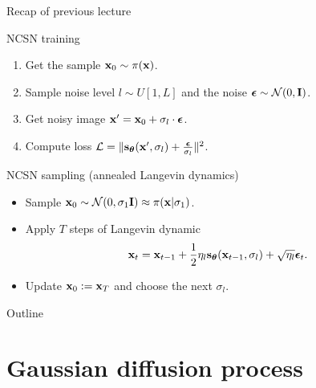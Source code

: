 \begin{frame}{Recap of previous lecture}
	\begin{block}{NCSN training}
		\begin{enumerate}
			\item Get the sample $\mathbf{x}_0 \sim \pi(\mathbf{x})$.
			\item Sample noise level $l \sim U[1, L]$ and the noise $\boldsymbol{\epsilon} \sim \mathcal{N}(0, \mathbf{I})$.
			\item Get noisy image $\mathbf{x}' = \mathbf{x}_0 + \sigma_l \cdot \boldsymbol{\epsilon}$.
			\item Compute loss $ \mathcal{L} = \| \mathbf{s}_{\boldsymbol{\theta}}(\mathbf{x}', \sigma_l) + \frac{\boldsymbol{\epsilon}}{\sigma_l} \|^2 $.
		\end{enumerate}
	\end{block}
	\begin{block}{NCSN sampling (annealed Langevin dynamics)}
		\begin{itemize}
			\item Sample $\mathbf{x}_0 \sim \mathcal{N}(0, \sigma_1 \mathbf{I}) \approx \pi(\mathbf{x} | \sigma_1)$.
			\item Apply $T$ steps of Langevin dynamic
			\vspace{-0.2cm}
			\[
				\mathbf{x}_t = \mathbf{x}_{t-1} + \frac{1}{2}\eta_l \mathbf{s}_{\boldsymbol{\theta}}(\mathbf{x}_{t - 1}, \sigma_l) + \sqrt{\eta_l} \boldsymbol{\epsilon}_t.
			\] 
			\vspace{-0.5cm}
			\item Update $\mathbf{x}_0 := \mathbf{x}_T$ and choose the next $\sigma_l$.
		\end{itemize}
	\end{block}
\end{frame}
\begin{frame}{Outline}
	\tableofcontents
\end{frame}
\section{Gaussian diffusion process}
